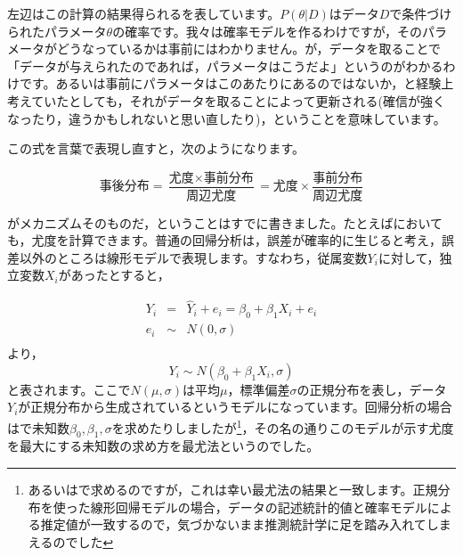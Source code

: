 \documentclass{ltjsbook}
\begin{document}
左辺はこの計算の結果得られるを表しています。$P(\theta|D)$はデータ$D$で条件づけられたパラメータ$\theta$の確率です。我々は確率モデルを作るわけですが，そのパラメータがどうなっているかは事前にはわかりません。が，データを取ることで「データが与えられたのであれば，パラメータはこうだよ」というのがわかるわけです。あるいは事前にパラメータはこのあたりにあるのではないか，と経験上考えていたとしても，それがデータを取ることによって更新される(確信が強くなったり，違うかもしれないと思い直したり)，ということを意味しています。

この式を言葉で表現し直すと，次のようになります。

$$ \mbox{事後分布} = \frac{\mbox{尤度}\times \mbox{事前分布}}{\mbox{周辺尤度}} = \mbox{尤度} \times \frac{事前分布}{周辺尤度}$$

がメカニズムそのものだ，ということはすでに書きました。たとえばにおいても，尤度を計算できます。普通の回帰分析は，誤差が確率的に生じると考え，誤差以外のところは線形モデルで表現します。すなわち，従属変数$Y_i$に対して，独立変数$X_i$があったとすると，

\begin{equation*}
	\begin{array}{lll}
		Y_i & =    & \hat{Y}_i + e_i = \beta_0 + \beta_1 X_i + e_i \\
		e_i & \sim & N(0,\sigma)                                   \\
	\end{array}
\end{equation*}
より，
$$ Y_i \sim N(\beta_0 + \beta_1 X_i, \sigma) $$
と表されます。ここで$N(\mu,\sigma)$は平均$\mu$，標準偏差$\sigma$の正規分布を表し，データ$Y_i$が正規分布から生成されているというモデルになっています。回帰分析の場合はで未知数$\beta_0,\beta_1,\sigma$を求めたりしましたが\footnote{あるいはで求めるのですが，これは幸い最尤法の結果と一致します。正規分布を使った線形回帰モデルの場合，データの記述統計的値と確率モデルによる推定値が一致するので，気づかないまま推測統計学に足を踏み入れてしまえるのでした}，その名の通りこのモデルが示す尤度を最大にする未知数の求め方を最尤法というのでした。
\end{document}
